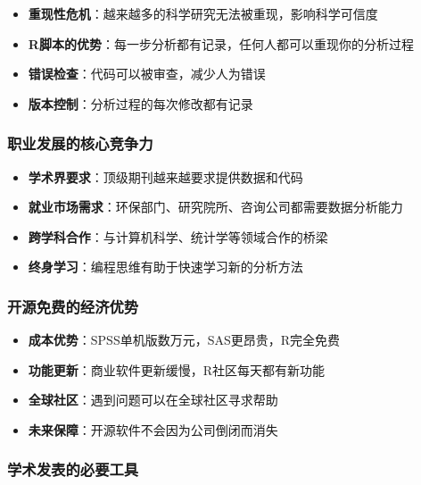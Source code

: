 \documentclass[
]{book}
\providecommand{\tightlist}{%
  \setlength{\itemsep}{0pt}\setlength{\parskip}{0pt}}
\begin{document}
\begin{itemize}
\tightlist
\item
  \textbf{重现性危机}：越来越多的科学研究无法被重现，影响科学可信度
\item
  \textbf{R脚本的优势}：每一步分析都有记录，任何人都可以重现你的分析过程
\item
  \textbf{错误检查}：代码可以被审查，减少人为错误
\item
  \textbf{版本控制}：分析过程的每次修改都有记录
\end{itemize}

\hypertarget{ux804cux4e1aux53d1ux5c55ux7684ux6838ux5fc3ux7adeux4e89ux529b}{%
\subsubsection{职业发展的核心竞争力}\label{ux804cux4e1aux53d1ux5c55ux7684ux6838ux5fc3ux7adeux4e89ux529b}}

\begin{itemize}
\tightlist
\item
  \textbf{学术界要求}：顶级期刊越来越要求提供数据和代码
\item
  \textbf{就业市场需求}：环保部门、研究院所、咨询公司都需要数据分析能力
\item
  \textbf{跨学科合作}：与计算机科学、统计学等领域合作的桥梁
\item
  \textbf{终身学习}：编程思维有助于快速学习新的分析方法
\end{itemize}

\hypertarget{ux5f00ux6e90ux514dux8d39ux7684ux7ecfux6d4eux4f18ux52bf}{%
\subsubsection{开源免费的经济优势}\label{ux5f00ux6e90ux514dux8d39ux7684ux7ecfux6d4eux4f18ux52bf}}

\begin{itemize}
\tightlist
\item
  \textbf{成本优势}：SPSS单机版数万元，SAS更昂贵，R完全免费
\item
  \textbf{功能更新}：商业软件更新缓慢，R社区每天都有新功能
\item
  \textbf{全球社区}：遇到问题可以在全球社区寻求帮助
\item
  \textbf{未来保障}：开源软件不会因为公司倒闭而消失
\end{itemize}

\hypertarget{ux5b66ux672fux53d1ux8868ux7684ux5fc5ux8981ux5de5ux5177}{%
\subsubsection{学术发表的必要工具}\label{ux5b66ux672fux53d1ux8868ux7684ux5fc5ux8981ux5de5ux5177}}
\end{document}
